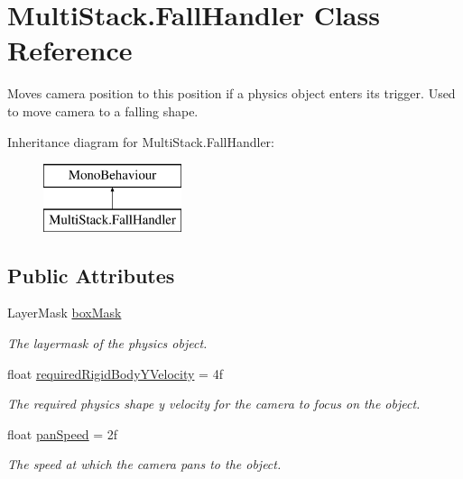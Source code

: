 \hypertarget{class_multi_stack_1_1_fall_handler}{}\section{Multi\+Stack.\+Fall\+Handler Class Reference}
\label{class_multi_stack_1_1_fall_handler}


Moves camera position to this position if a physics object enters its trigger. Used to move camera to a falling shape.  


Inheritance diagram for Multi\+Stack.\+Fall\+Handler\+:\begin{figure}[H]
\begin{center}
\leavevmode
\includegraphics[height=2.000000cm]{class_multi_stack_1_1_fall_handler}
\end{center}
\end{figure}
\subsection*{Public Attributes}
\begin{DoxyCompactItemize}
\item 
Layer\+Mask \hyperlink{class_multi_stack_1_1_fall_handler_ad7f6668311c604a6c8780f43d111b637}{box\+Mask}
\begin{DoxyCompactList}\small\item\em The layermask of the physics object. \end{DoxyCompactList}\item 
float \hyperlink{class_multi_stack_1_1_fall_handler_a29322f628b3b2755771970610f11c382}{required\+Rigid\+Body\+Y\+Velocity} = 4f
\begin{DoxyCompactList}\small\item\em The required physics shape y velocity for the camera to focus on the object. \end{DoxyCompactList}\item 
float \hyperlink{class_multi_stack_1_1_fall_handler_a8bfc0ce850601f85f1d5124f31442bce}{pan\+Speed} = 2f
\begin{DoxyCompactList}\small\item\em The speed at which the camera pans to the object. \end{DoxyCompactList}\end{DoxyCompactItemize}


